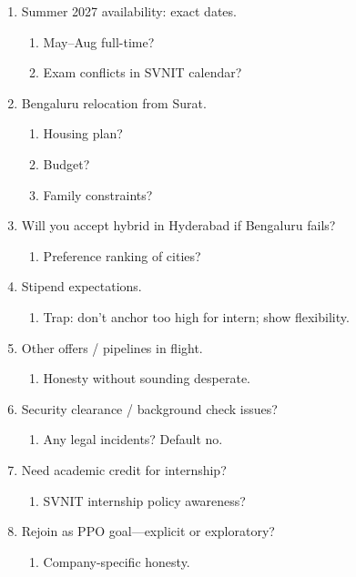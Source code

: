 \documentclass[9pt,a4paper]{article}
\begin{document}
\begin{enumerate}[label=\textbf{Q\arabic*:}, leftmargin=*]
  \item Summer 2027 availability: exact dates.
  \begin{enumerate}[label=\textit{FU\arabic*:}, leftmargin=2em]
    \item May--Aug full-time?
    \item Exam conflicts in SVNIT calendar?
  \end{enumerate}
  \item Bengaluru relocation from Surat.
  \begin{enumerate}[label=\textit{FU\arabic*:}, leftmargin=2em]
    \item Housing plan?
    \item Budget?
    \item Family constraints?
  \end{enumerate}
  \item Will you accept hybrid in Hyderabad if Bengaluru fails?
  \begin{enumerate}[label=\textit{FU\arabic*:}, leftmargin=2em]
    \item Preference ranking of cities?
  \end{enumerate}
  \item Stipend expectations.
  \begin{enumerate}[label=\textit{FU\arabic*:}, leftmargin=2em]
    \item Trap: don't anchor too high for intern; show flexibility.
  \end{enumerate}
  \item Other offers / pipelines in flight.
  \begin{enumerate}[label=\textit{FU\arabic*:}, leftmargin=2em]
    \item Honesty without sounding desperate.
  \end{enumerate}
  \item Security clearance / background check issues?
  \begin{enumerate}[label=\textit{FU\arabic*:}, leftmargin=2em]
    \item Any legal incidents? Default no.
  \end{enumerate}
  \item Need academic credit for internship?
  \begin{enumerate}[label=\textit{FU\arabic*:}, leftmargin=2em]
    \item SVNIT internship policy awareness?
  \end{enumerate}
  \item Rejoin as PPO goal---explicit or exploratory?
  \begin{enumerate}[label=\textit{FU\arabic*:}, leftmargin=2em]
    \item Company-specific honesty.
  \end{enumerate}
\end{enumerate}
\end{document}
